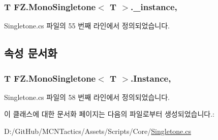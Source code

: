 \subsubsection[{\texorpdfstring{\+\_\+instance}{_instance}}]{\setlength{\rightskip}{0pt plus 5cm}T {\bf F\+Z.\+Mono\+Singletone}$<$ T $>$.\+\_\+instance\hspace{0.3cm}{\ttfamily [static]}, {\ttfamily [private]}}\hypertarget{class_f_z_1_1_mono_singletone_ad6822c95bf3a117cd4cceb793eef5ed7}{}\label{class_f_z_1_1_mono_singletone_ad6822c95bf3a117cd4cceb793eef5ed7}


Singletone.\+cs 파일의 55 번째 라인에서 정의되었습니다.



\subsection{속성 문서화}
\subsubsection[{\texorpdfstring{Instance}{Instance}}]{\setlength{\rightskip}{0pt plus 5cm}T {\bf F\+Z.\+Mono\+Singletone}$<$ T $>$.Instance\hspace{0.3cm}{\ttfamily [static]}, {\ttfamily [get]}}\hypertarget{class_f_z_1_1_mono_singletone_a39e34129d25a9664576949259e7dfd5f}{}\label{class_f_z_1_1_mono_singletone_a39e34129d25a9664576949259e7dfd5f}


Singletone.\+cs 파일의 58 번째 라인에서 정의되었습니다.



이 클래스에 대한 문서화 페이지는 다음의 파일로부터 생성되었습니다.\+:\begin{DoxyCompactItemize}
\item 
D\+:/\+Git\+Hub/\+M\+C\+N\+Tactics/\+Assets/\+Scripts/\+Core/\hyperlink{_singletone_8cs}{Singletone.\+cs}\end{DoxyCompactItemize}
